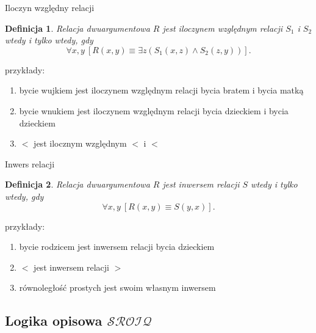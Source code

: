 \documentclass{beamer}
\newtheorem{definicja}{Definicja}
\newcommand {\SROIQ} {\ensuremath{\mathcal{SROIQ}}}
\begin{document}
\begin{frame}{Iloczyn względny relacji}
%
\begin{definicja}
Relacja dwuargumentowa $R$ jest \emph{iloczynem względnym relacji} $S_1$ i $S_2$ wtedy i tylko wtedy, gdy $$\forall x,y ~[R(x,y) \equiv \exists z (S_{1}(x,z) \land S_{2}(z,y))].$$
\end{definicja}
%
przykłady:
\begin{enumerate}
\item bycie wujkiem jest iloczynem względnym relacji bycia bratem i bycia matką
\item bycie wnukiem jest iloczynem względnym relacji bycia dzieckiem i bycia dzieckiem
\item $<$ jest ilocznym względnym $<$ i $<$
\end{enumerate}
\end{frame}

%
\begin{frame}{Inwers relacji}
%
\begin{definicja}
Relacja dwuargumentowa $R$ jest \emph{inwersem relacji} $S$ wtedy i tylko wtedy, gdy $$\forall x,y ~[R(x,y) \equiv S(y,x)].$$
\end{definicja}
%
przykłady:
\begin{enumerate}
\item bycie rodzicem jest inwersem relacji bycia dzieckiem
\item $<$ jest inwersem relacji $>$
\item równoległość prostych jest swoim własnym inwersem
\end{enumerate}
\end{frame}


\subsection{Logika opisowa \SROIQ}
\end{document}
